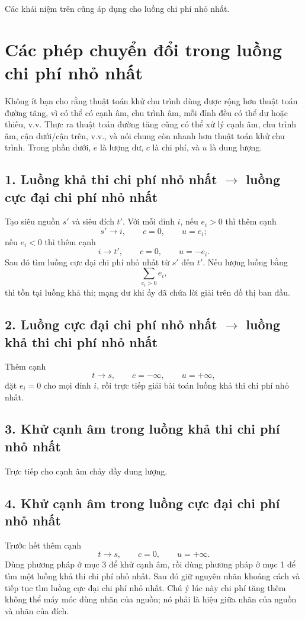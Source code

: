 \documentclass[11pt]{article}
\begin{document}
Các khái niệm trên cũng áp dụng cho luồng chi phí nhỏ nhất.

\section{Các phép chuyển đổi trong luồng chi phí nhỏ nhất}

Không ít bạn cho rằng thuật toán khử chu trình dùng được rộng hơn thuật toán
đường tăng, vì có thể có cạnh âm, chu trình âm, mỗi đỉnh đều có thể dư hoặc
thiếu, v.v. Thực ra thuật toán đường tăng cũng có thể xử lý cạnh âm, chu trình
âm, cận dưới/cận trên, v.v., và nói chung còn nhanh hơn thuật toán khử chu
trình. Trong phần dưới, $e$ là lượng dư, $c$ là chi phí, và $u$ là dung lượng.

\subsection*{1. Luồng khả thi chi phí nhỏ nhất $\to$ luồng cực đại chi phí nhỏ nhất}

Tạo siêu nguồn $s'$ và siêu đích $t'$. Với mỗi đỉnh $i$, nếu $e_i>0$ thì thêm
cạnh
\[
  s'\to i,\qquad c=0,\qquad u=e_i;
\]
nếu $e_i<0$ thì thêm cạnh
\[
  i\to t',\qquad c=0,\qquad u=-e_i.
\]
Sau đó tìm luồng cực đại chi phí nhỏ nhất từ $s'$ đến $t'$. Nếu lượng luồng
bằng
\[
  \sum_{e_i>0} e_i,
\]
thì tồn tại luồng khả thi; mạng dư khi ấy đã chứa lời giải trên đồ thị ban đầu.

\subsection*{2. Luồng cực đại chi phí nhỏ nhất $\to$ luồng khả thi chi phí nhỏ nhất}

Thêm cạnh
\[
  t\to s,\qquad c=-\infty,\qquad u=+\infty,
\]
đặt $e_i=0$ cho mọi đỉnh $i$, rồi trực tiếp giải bài toán luồng khả thi chi
phí nhỏ nhất.

\subsection*{3. Khử cạnh âm trong luồng khả thi chi phí nhỏ nhất}

Trực tiếp cho cạnh âm chảy đầy dung lượng.

\subsection*{4. Khử cạnh âm trong luồng cực đại chi phí nhỏ nhất}

Trước hết thêm cạnh
\[
  t\to s,\qquad c=0,\qquad u=+\infty.
\]
Dùng phương pháp ở mục 3 để khử cạnh âm, rồi dùng phương pháp ở mục 1 để tìm
một luồng khả thi chi phí nhỏ nhất. Sau đó giữ nguyên nhãn khoảng cách và tiếp
tục tìm luồng cực đại chi phí nhỏ nhất. Chú ý lúc này chi phí tăng thêm không
thể máy móc dùng nhãn của nguồn; nó phải là hiệu giữa nhãn của nguồn và nhãn
của đích.
\end{document}
